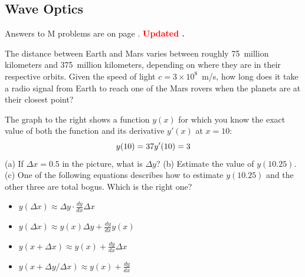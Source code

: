 \subsection{Wave Optics} 


Answers to M problems are on page \pageref{wave_optics_prob_answers}.  \textbf{\textcolor{red}{Updated \DTMnow.}}


\begin{Exercise}
The distance between Earth and Mars varies between roughly 75~million kilometers and 375~million kilometers, depending on where they are in their respective orbits.  
Given the speed of light $c=3\times10^8$~m/s,  how long does it take a radio signal from Earth to reach one of the Mars rovers when the planets are at their closest point?
\end{Exercise}
\begin{Answer}
\end{Answer}



\begin{Exercise}
The graph to the right shows a function $y(x)$ for which you know the exact value of both the function and its derivative $y'(x)$ at $x=10$:
$$
y(10)=37 \\
y'(10)=3
$$
(a) If $\Delta x=0.5$ in the picture, what is $\Delta y$?
(b) Estimate the value of $y(10.25)$.
(c) One of the following equations describes how to estimate $y(10.25)$ and the other three are total bogus. Which is the right one?
\begin{itemize}
\item $y(\Delta x)\approx \Delta y \cdot \frac{dy}{dx} \Delta x$
\item $y(\Delta x)\approx y(x)\Delta y + \frac{dy}{dx}y(x)$
\item $y(x+\Delta x)\approx y(x) + \frac{dy}{dx} \Delta x$
\item $y(x+\Delta y / \Delta x) \approx y(x) + \frac{dy}{dx}$
\end{itemize}


\end{Exercise}
\begin{Answer}
\end{Answer}



